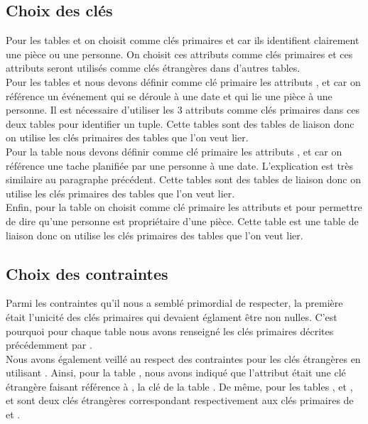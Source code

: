 \subsection{Choix des clés}
Pour les tables \textbf{} et \textbf{} on choisit comme clés primaires  et  car ils identifient clairement une pièce ou une personne. On choisit ces attributs comme clés primaires et ces attributs seront utilisés comme clés étrangères dans d'autres tables.\\

Pour les tables \textbf{} et \textbf{} nous devons définir comme clé primaire les attributs ,  et  car on référence un événement qui se déroule à une date et qui lie une pièce à une personne. Il est nécessaire d'utiliser les 3 attributs comme clés primaires dans ces deux tables pour identifier un tuple. Cette tables sont des tables de liaison donc on utilise les clés primaires des tables que l'on veut lier.\\

Pour la table \textbf{}  nous devons définir comme clé primaire les attributs ,  et  car on référence une tache planifiée par une personne à une date. L'explication est très similaire au paragraphe précédent. Cette tables sont des tables de liaison donc on utilise les clés primaires des tables que l'on veut lier.\\

Enfin, pour la table \textbf{} on choisit comme clé primaire les attributs  et  pour permettre de dire qu'une personne est propriétaire d'une pièce. Cette table est une table de liaison donc on utilise les clés primaires des tables que l'on veut lier.


\subsection{Choix des contraintes}
Parmi les contraintes qu'il nous a semblé primordial de respecter, la première était l'unicité des clés primaires qui devaient églament être non nulles. C'est pourquoi pour chaque table nous avons renseigné les clés primaires décrites précédemment par .\\

Nous avons également veillé au respect des contraintes pour les clés étrangères en utilisant . Ainsi, pour la table , nous avons indiqué que l'attribut  était une clé étrangère faisant référence à , la clé de la table . De même, pour les tables ,  et ,  et  sont deux clés étrangères correspondant respectivement aux clés primaires de  et .\\
